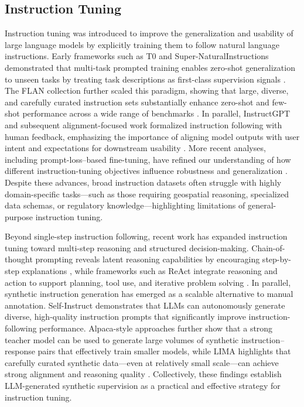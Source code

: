 \documentclass[a4paper,fleqn]{cas-sc}
\begin{document}
\subsection{Instruction Tuning}

Instruction tuning was introduced to improve the generalization and usability of large language models by explicitly training them to follow natural language instructions. Early frameworks such as T0 and Super-NaturalInstructions demonstrated that multi-task prompted training enables zero-shot generalization to unseen tasks by treating task descriptions as first-class supervision signals \cite{sanh2022t0,mishra2022supernatural}. The FLAN collection further scaled this paradigm, showing that large, diverse, and carefully curated instruction sets substantially enhance zero-shot and few-shot performance across a wide range of benchmarks \cite{longpre2023flan}. In parallel, InstructGPT and subsequent alignment-focused work formalized instruction following with human feedback, emphasizing the importance of aligning model outputs with user intent and expectations for downstream usability \cite{ouyang2022training}. More recent analyses, including prompt-loss–based fine-tuning, have refined our understanding of how different instruction-tuning objectives influence robustness and generalization \cite{huerta2024instruction}. Despite these advances, broad instruction datasets often struggle with highly domain-specific tasks—such as those requiring geospatial reasoning, specialized data schemas, or regulatory knowledge—highlighting limitations of general-purpose instruction tuning.

Beyond single-step instruction following, recent work has expanded instruction tuning toward multi-step reasoning and structured decision-making. Chain-of-thought prompting reveals latent reasoning capabilities by encouraging step-by-step explanations \cite{wei2022cot}, while frameworks such as ReAct integrate reasoning and action to support planning, tool use, and iterative problem solving \cite{yao2023react}. In parallel, synthetic instruction generation has emerged as a scalable alternative to manual annotation. Self-Instruct \cite{wang2023selfinstruct} demonstrates that LLMs can autonomously generate diverse, high-quality instruction prompts that significantly improve instruction-following performance. Alpaca-style approaches further show that a strong teacher model can be used to generate large volumes of synthetic instruction–response pairs that effectively train smaller models, while LIMA highlights that carefully curated synthetic data—even at relatively small scale—can achieve strong alignment and reasoning quality \cite{taori2023alpaca,zhou2023lima}. Collectively, these findings establish LLM-generated synthetic supervision as a practical and effective strategy for instruction tuning.
\end{document}
